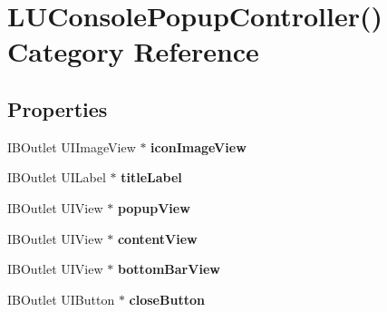 \hypertarget{category_l_u_console_popup_controller_07_08}{}\section{L\+U\+Console\+Popup\+Controller() Category Reference}
\label{category_l_u_console_popup_controller_07_08}
\subsection*{Properties}
\begin{DoxyCompactItemize}
\item 
\mbox{\label{category_l_u_console_popup_controller_07_08_a41d8f88ed47361601c3c0fbfb86c2fdd}} 
I\+B\+Outlet U\+I\+Image\+View $\ast$ {\bfseries icon\+Image\+View}
\item 
\mbox{\label{category_l_u_console_popup_controller_07_08_a2e2ad5f4591874d670e297497658f7a1}} 
I\+B\+Outlet U\+I\+Label $\ast$ {\bfseries title\+Label}
\item 
\mbox{\label{category_l_u_console_popup_controller_07_08_aff4605a8d1bb838187c39e90f67b5d69}} 
I\+B\+Outlet U\+I\+View $\ast$ {\bfseries popup\+View}
\item 
\mbox{\label{category_l_u_console_popup_controller_07_08_aec57b7d59264f188f44844b7bf2fdb05}} 
I\+B\+Outlet U\+I\+View $\ast$ {\bfseries content\+View}
\item 
\mbox{\label{category_l_u_console_popup_controller_07_08_af2f7c33dfb2e99f983f27a881c272dec}} 
I\+B\+Outlet U\+I\+View $\ast$ {\bfseries bottom\+Bar\+View}
\item 
\mbox{\label{category_l_u_console_popup_controller_07_08_a9051cbe461091c3d70d42cbfd2270cc3}} 
I\+B\+Outlet U\+I\+Button $\ast$ {\bfseries close\+Button}
\item 
\mbox{\label{category_l_u_console_popup_controller_07_08_a545bcfaf906d568fc620b92e2c3ac456}} 

\end{DoxyCompactItemize}
